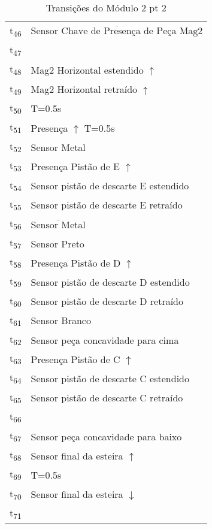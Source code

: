 \begin{table}[htbp]
\caption{Transições do Módulo 2 pt 2}
\centering
\begin{tabular}{ll}
t\textsubscript{46} & \(\overline{\mbox{Sensor Chave de Presença de Peça Mag2}}\)\\
t\textsubscript{47} & \\
t\textsubscript{48} & Mag2 Horizontal estendido \(\uparrow\)\\
t\textsubscript{49} & Mag2 Horizontal retraído \(\uparrow\)\\
t\textsubscript{50} & T=0.5s\\
t\textsubscript{51} & Presença \(\uparrow\) T=0.5s\\
t\textsubscript{52} & Sensor Metal\\
t\textsubscript{53} & Presença Pistão de E \(\uparrow\)\\
t\textsubscript{54} & Sensor pistão de descarte E estendido\\
t\textsubscript{55} & Sensor pistão de descarte E retraído\\
t\textsubscript{56} & \(\overline{\mbox{Sensor Metal}}\)\\
t\textsubscript{57} & Sensor Preto\\
t\textsubscript{58} & Presença Pistão de D \(\uparrow\)\\
t\textsubscript{59} & Sensor pistão de descarte D estendido\\
t\textsubscript{60} & Sensor pistão de descarte D retraído\\
t\textsubscript{61} & Sensor Branco\\
t\textsubscript{62} & Sensor peça concavidade para cima\\
t\textsubscript{63} & Presença Pistão de C \(\uparrow\)\\
t\textsubscript{64} & Sensor pistão de descarte C estendido\\
t\textsubscript{65} & Sensor pistão de descarte C retraído\\
t\textsubscript{66} & \\
t\textsubscript{67} & Sensor peça concavidade para baixo\\
t\textsubscript{68} & Sensor final da esteira \(\uparrow\)\\
t\textsubscript{69} & T=0.5s\\
t\textsubscript{70} & Sensor final da esteira \(\downarrow\)\\
t\textsubscript{71} & \\
\end{tabular}
\end{table}
